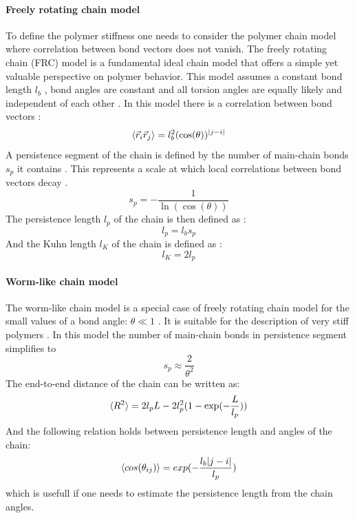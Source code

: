 \documentclass[
    paper=A4,pagesize=automedia,fontsize=12pt,
    BCOR=15mm,DIV=22,
    twoside,headinclude,footinclude=false,
    fleqn,             %
    bibliography=totocnumbered,          %
    listof=totoc,                %
    listof=flat,                 %
    cleardoublepage=empty      %
    numbers=endperiod
]{scrartcl}
\begin{document}
\paragraph{Freely rotating chain model}
To define the polymer stiffness one needs to consider the polymer chain model
where correlation between bond vectors does not vanish.
The freely rotating chain (FRC) model is a fundamental ideal chain model 
that offers a simple yet valuable perspective on polymer behavior. 
This model assumes a constant bond length $l_b$ \cite{Rub_Colby_PolyPhy:2005}, 
bond angles are constant \cite{Rub_Colby_PolyPhy:2005} and
all torsion angles are equally likely and independent of each other \cite{Rub_Colby_PolyPhy:2005}.
In this model there is a correlation between bond vectors \cite{Rub_Colby_PolyPhy:2005}:
\begin{equation}
    \langle\vec{r}_i \vec{r}_j\rangle = l_b^2 (\cos(\theta))^{|j-i|}
\end{equation}
A persistence segment of the chain is defined by the number of main-chain bonds $s_p$ 
it contains \cite{Rub_Colby_PolyPhy:2005}. This represents a scale at which local 
correlations between bond vectors decay \cite{Rub_Colby_PolyPhy:2005}.
\begin{equation}
    s_p = - \frac{1}{\ln(\cos(\theta))}
\end{equation}
The persistence length $l_p$ of the chain is then defined as \cite{Rub_Colby_PolyPhy:2005}:
\begin{equation}
    l_p = l_b s_p
\end{equation}
And the Kuhn length $l_K$ of the chain is defined as \cite{Rub_Colby_PolyPhy:2005}:
\begin{equation}
    l_K = 2 l_p
\end{equation}

\paragraph{Worm-like chain model}
The worm-like chain model is a special case of freely rotating chain model for
the small values of a bond angle: $\theta \ll 1$ \cite{Rub_Colby_PolyPhy:2005}.
It is suitable for the description of very stiff polymers \cite{Rub_Colby_PolyPhy:2005}.
In this model the number of main-chain bonds in persistence segment simplifies to 
\begin{equation}
    s_p \approx \frac{2}{\theta^2}
\end{equation}
The end-to-end distance of the chain can be written as:
\begin{equation}
    \langle R^2\rangle = 2 l_p L - 2 l_p^2 (1-\exp(-\frac{L}{l_p}))
\end{equation}
And the following relation holds between persistence length and angles of the chain:
\begin{equation}
    \langle cos(\theta_{ij})\rangle = exp(-\frac{l_b |j-i|}{l_p})
\end{equation}
which is usefull if one needs to estimate the persistence length from the chain angles.
\end{document}
